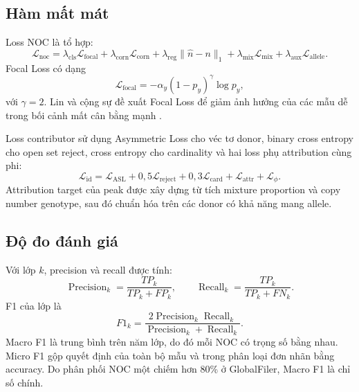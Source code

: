 \documentclass[12pt,a4paper]{article}
\begin{document}
\subsection{Hàm mất mát}

Loss NOC là tổ hợp:
\begin{equation}
\mathcal{L}_{\mathrm{noc}}=
\lambda_{\mathrm{cls}}\mathcal{L}_{\mathrm{focal}}+
\lambda_{\mathrm{corn}}\mathcal{L}_{\mathrm{corn}}+
\lambda_{\mathrm{reg}}\lVert \hat{n}-n\rVert_1+
\lambda_{\mathrm{mix}}\mathcal{L}_{\mathrm{mix}}+
\lambda_{\mathrm{aux}}\mathcal{L}_{\mathrm{allele}}.
\end{equation}
Focal Loss có dạng
\begin{equation}
\mathcal{L}_{\mathrm{focal}}=
-\alpha_y(1-p_y)^\gamma\log p_y,
\end{equation}
với \(\gamma=2\). Lin và cộng sự đề xuất Focal Loss để giảm ảnh hưởng của các mẫu dễ trong bối cảnh mất cân bằng mạnh \cite{lin2017}.

Loss contributor sử dụng Asymmetric Loss cho véc tơ donor, binary cross entropy cho open set reject, cross entropy cho cardinality và hai loss phụ attribution cùng phi:
\begin{equation}
\mathcal{L}_{\mathrm{id}}=
\mathcal{L}_{\mathrm{ASL}}+
0,5\mathcal{L}_{\mathrm{reject}}+
0,3\mathcal{L}_{\mathrm{card}}+
\mathcal{L}_{\mathrm{attr}}+
\mathcal{L}_{\phi}.
\end{equation}
Attribution target của peak được xây dựng từ tích mixture proportion và copy number genotype, sau đó chuẩn hóa trên các donor có khả năng mang allele.

\subsection{Độ đo đánh giá}

Với lớp \(k\), precision và recall được tính:
\begin{equation}
\operatorname{Precision}_k=\frac{TP_k}{TP_k+FP_k},
\qquad
\operatorname{Recall}_k=\frac{TP_k}{TP_k+FN_k}.
\end{equation}
F1 của lớp là
\begin{equation}
F1_k=\frac{2\operatorname{Precision}_k\operatorname{Recall}_k}
{\operatorname{Precision}_k+\operatorname{Recall}_k}.
\end{equation}
Macro F1 là trung bình trên năm lớp, do đó mỗi NOC có trọng số bằng nhau. Micro F1 gộp quyết định của toàn bộ mẫu và trong phân loại đơn nhãn bằng accuracy. Do phân phối NOC một chiếm hơn 80\% ở GlobalFiler, Macro F1 là chỉ số chính.
\end{document}
